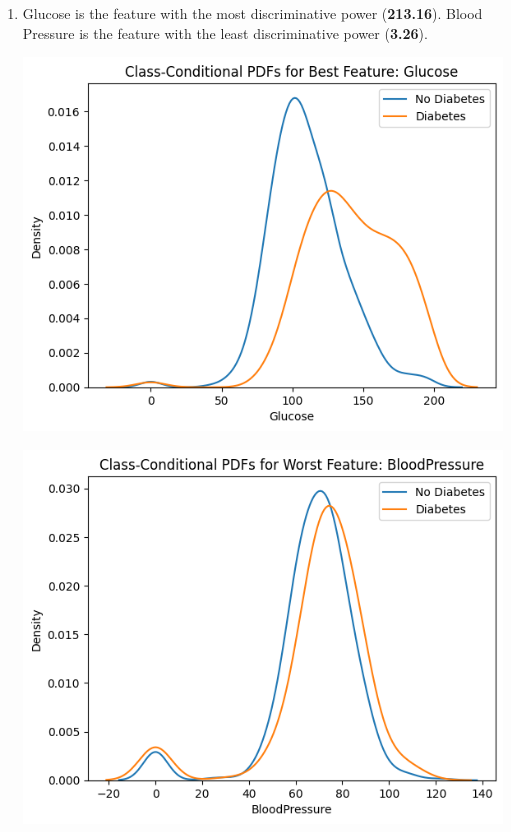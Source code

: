 \documentclass{article}
\begin{document}
\begin{enumerate}[leftmargin=\labelsep]
\item Glucose is the feature with the most discriminative power (\textbf{213.16}).
Blood Pressure is the feature with the least discriminative power (\textbf{3.26}).
\begin{center}
    \begin{minipage}[t]{0.45\textwidth}
        \centering
        \includegraphics[width=\textwidth]{img/best_disc_feature.png} 
    \end{minipage}
    \hfill
    \begin{minipage}[t]{0.45\textwidth}
        \centering
        \includegraphics[width=\textwidth]{img/worst_dict_feature.png} 
    \end{minipage}
\end{center}


\end{enumerate}
\end{document}
